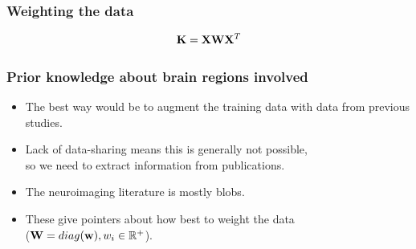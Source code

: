 
\begin{frame}
\frametitle{Weighting the data}
\begin{Huge}
\begin{align*}
{\bf K} = {\bf X}{\bf W}{\bf X}^T
\end{align*}
\end{Huge}
\end{frame}

\begin{frame}
\frametitle{Prior knowledge about brain regions involved}
\begin{itemize}
\item The best way would be to augment the training data with data from previous studies.
\item Lack of data-sharing means this is generally not possible,\\
      so we need to extract information from publications.
\item The neuroimaging literature is mostly blobs.
\item These give pointers about how best to weight the data\\
      (${\bf W} = diag({\bf w}), w_i \in \mathbb{R}^+$).
\end{itemize}
\end{frame}

